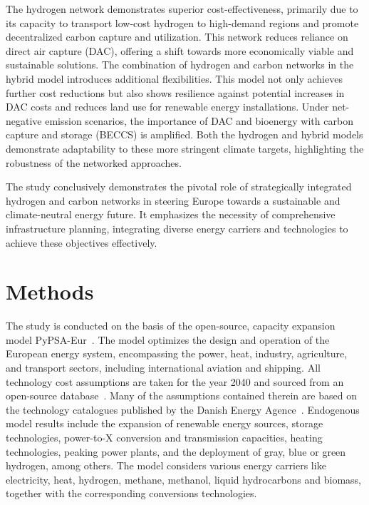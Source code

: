 \documentclass[twocolumn]{article}
\begin{document}
The hydrogen network demonstrates superior cost-effectiveness, primarily due to its capacity to transport low-cost hydrogen to high-demand regions and promote decentralized carbon capture and utilization. This network reduces reliance on direct air capture (DAC), offering a shift towards more economically viable and sustainable solutions.
The combination of hydrogen and carbon networks in the hybrid model introduces additional flexibilities. This model not only achieves further cost reductions but also shows resilience against potential increases in DAC costs and reduces land use for renewable energy installations.
Under net-negative emission scenarios, the importance of DAC and bioenergy with carbon capture and storage (BECCS) is amplified. Both the hydrogen and hybrid models demonstrate adaptability to these more stringent climate targets, highlighting the robustness of the networked approaches.


The study conclusively demonstrates the pivotal role of strategically integrated hydrogen and carbon networks in steering Europe towards a sustainable and climate-neutral energy future. It emphasizes the necessity of comprehensive infrastructure planning, integrating diverse energy carriers and technologies to achieve these objectives effectively.



\section*{Methods}
\label{sec:methodology}

The study is conducted on the basis of the open-source, capacity expansion model PyPSA-Eur~\cite{horschPyPSAEurOpenOptimisation2018,brownSynergiesSectorCoupling2018,PyPSAEurSecSectorCoupledOpen2023}.
The model optimizes the design and operation of the European energy system, encompassing the power, heat, industry, agriculture, and transport sectors, including international aviation and shipping.
All technology cost assumptions are taken for the year 2040 and sourced from an open-source database~\cite{lisazeyenPyPSATechnologydataTechnology2023}.
Many of the assumptions contained therein are based on the technology catalogues published by the Danish Energy Agence~\cite{TODO}.
Endogenous model results include the expansion of renewable energy sources, storage technologies, power-to-X conversion and transmission capacities, heating technologies, peaking power plants, and the deployment of gray, blue or green hydrogen, among others.
The model considers various energy carriers like electricity, heat, hydrogen, methane, methanol, liquid hydrocarbons and biomass, together with the corresponding conversions technologies.
\end{document}
